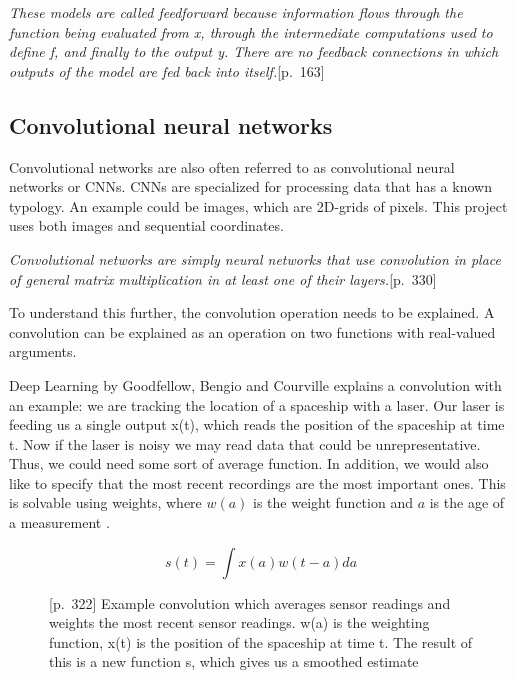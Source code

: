\begin{displayquote}
\textit{These models are called feedforward because information flows through the function being evaluated from x, through the intermediate computations used to define f, and finally to the output y. There are no feedback connections in which outputs of the model are fed back into itself.}{\cite{goodfellow_deep_2016}[p.~163]}
\end{displayquote}

\subsection{Convolutional neural networks}

Convolutional networks \cite{lecun_generalization_1989} are also often referred to as convolutional neural networks or CNNs. CNNs are specialized for processing data that has a known typology. An example could be images, which are 2D-grids of pixels. This project uses both images and sequential coordinates.

\begin{displayquote}
 \textit{Convolutional networks are simply neural networks that use convolution in place of general matrix multiplication in at least one of their layers.}{\cite{goodfellow_deep_2016}[p.~330]}
\end{displayquote}
To understand this further, the convolution operation needs to be explained. A convolution can be explained as an operation on two functions with real-valued arguments. 

Deep Learning by Goodfellow, Bengio and Courville explains a convolution with an example: we are tracking the location of a spaceship with a laser. Our laser is feeding us a single output x(t), which reads the position of the spaceship at time t. Now if the laser is noisy we may read data that could be unrepresentative. Thus, we could need some sort of average function. In addition, we would also like to specify that the most recent recordings are the most important ones. This is solvable using weights, where $w(a)$ is the weight function and $a$ is the age of a measurement \cite{goodfellow_deep_2016}.

\begin{figure}[H]
    \label{eqn:conv}
    \begin{equation}
    s(t) = \int x(a)w(t-a)da
    \end{equation}
    \caption{\cite{goodfellow_deep_2016}[p.~322] Example convolution which averages sensor readings and weights the most recent sensor readings. w(a) is the weighting function, x(t) is the position of the spaceship at time t. The result of this is a new function s, which gives us a smoothed estimate}
\end{figure}

